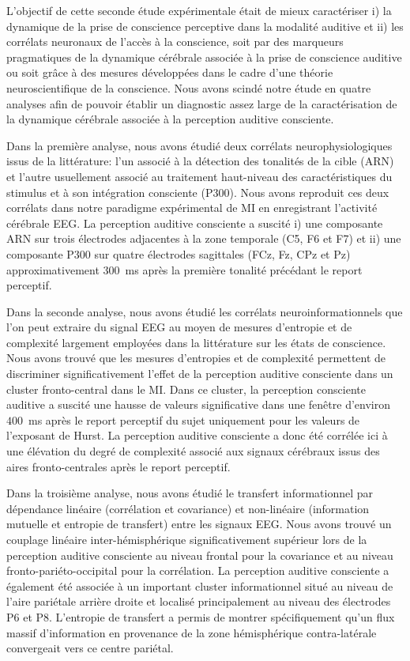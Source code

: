 L'objectif de cette seconde étude expérimentale était de mieux caractériser i) la dynamique de la prise de conscience perceptive dans la modalité auditive et ii) les corrélats neuronaux de l'accès à la conscience, soit par des marqueurs pragmatiques de la dynamique cérébrale associée à la prise de conscience auditive ou soit grâce à des mesures développées dans le cadre d'une théorie neuroscientifique de la conscience.
Nous avons scindé notre étude en quatre analyses afin de pouvoir établir un diagnostic assez large de la caractérisation de la dynamique cérébrale associée à la perception auditive consciente. 

Dans la première analyse, nous avons étudié deux corrélats neurophysiologiques issus de la littérature: l'un associé à la détection des tonalités de la cible (ARN) et l'autre usuellement associé au traitement haut-niveau des caractéristiques du stimulus et à son intégration consciente (P300). 
Nous avons reproduit ces deux corrélats dans notre paradigme expérimental de MI en enregistrant l'activité cérébrale EEG. 
La perception auditive consciente a suscité i) une composante ARN sur trois électrodes adjacentes à la zone temporale (C5, F6 et F7) et ii) une composante P300 sur quatre électrodes sagittales (FCz, Fz, CPz et Pz) approximativement $300$~ms après la première tonalité précédant le report perceptif. 

Dans la seconde analyse, nous avons étudié les corrélats neuroinformationnels que l'on peut extraire du signal EEG au moyen de mesures d'entropie et de complexité largement employées dans la littérature sur les états de conscience. 
Nous avons trouvé que les mesures d’entropies et de complexité permettent de discriminer significativement l’effet de la perception auditive consciente dans un cluster fronto-central dans le MI.
Dans ce cluster, la perception consciente auditive a suscité une hausse de valeurs significative dans une fenêtre d'environ $400$~ms après le report perceptif du sujet uniquement pour les valeurs de l'exposant de Hurst. 
La perception auditive consciente a donc été corrélée ici à une élévation du degré de complexité associé aux signaux cérébraux issus des aires fronto-centrales après le report perceptif.

Dans la troisième analyse, nous avons étudié le transfert informationnel par dépendance linéaire (corrélation et covariance) et non-linéaire (information mutuelle et entropie de transfert) entre les signaux EEG. 
Nous avons trouvé un couplage linéaire inter-hémisphérique significativement supérieur lors de la perception auditive consciente au niveau frontal pour la covariance et au niveau fronto-pariéto-occipital pour la corrélation. 
La perception auditive consciente a également été associée à un important cluster informationnel situé au niveau de l'aire pariétale arrière droite et localisé principalement au niveau des électrodes P6 et P8. 
L'entropie de transfert a permis de montrer spécifiquement qu'un flux massif d'information en provenance de la zone hémisphérique contra-latérale convergeait vers ce centre pariétal. 


